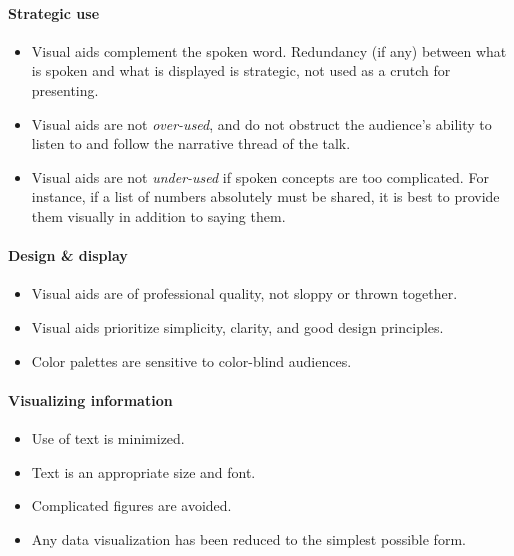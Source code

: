 \documentclass[
]{book}
\providecommand{\tightlist}{%
  \setlength{\itemsep}{0pt}\setlength{\parskip}{0pt}}
\begin{document}
\hypertarget{strategic-use}{%
\paragraph{Strategic use}\label{strategic-use}}

\begin{itemize}
\tightlist
\item
  Visual aids complement the spoken word. Redundancy (if any) between what is spoken and what is
  displayed is strategic, not used as a crutch for presenting.\\
\item
  Visual aids are not \emph{over-used}, and do not obstruct the audience's ability to listen to and follow the
  narrative thread of the talk.\\
\item
  Visual aids are not \emph{under-used} if spoken concepts are too complicated. For instance, if a list of
  numbers absolutely must be shared, it is best to provide them visually in addition to saying them.
\end{itemize}

\hypertarget{design-display}{%
\paragraph{Design \& display}\label{design-display}}

\begin{itemize}
\tightlist
\item
  Visual aids are of professional quality, not sloppy or thrown together.\\
\item
  Visual aids prioritize simplicity, clarity, and good design principles.\\
\item
  Color palettes are sensitive to color-blind audiences.
\end{itemize}

\hypertarget{visualizing-information}{%
\paragraph{Visualizing information}\label{visualizing-information}}

\begin{itemize}
\tightlist
\item
  Use of text is minimized.\\
\item
  Text is an appropriate size and font.\\
\item
  Complicated figures are avoided.\\
\item
  Any data visualization has been reduced to the simplest possible form.
\end{itemize}
\end{document}
